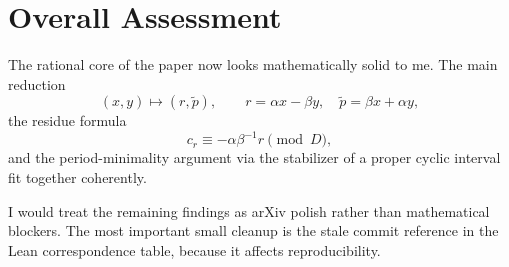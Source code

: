\documentclass[11pt]{article}
\begin{document}
\section*{Overall Assessment}

The rational core of the paper now looks mathematically solid to me.  The
main reduction
\[
  (x,y)\mapsto (r,\tilde p),
  \qquad
  r=\alpha x-\beta y,\quad
  \tilde p=\beta x+\alpha y,
\]
the residue formula
\[
  c_r \equiv -\alpha\beta^{-1}r \pmod D,
\]
and the period-minimality argument via the stabilizer of a proper cyclic
interval fit together coherently.

I would treat the remaining findings as arXiv polish rather than mathematical
blockers.  The most important small cleanup is the stale commit reference in
the Lean correspondence table, because it affects reproducibility.
\end{document}
